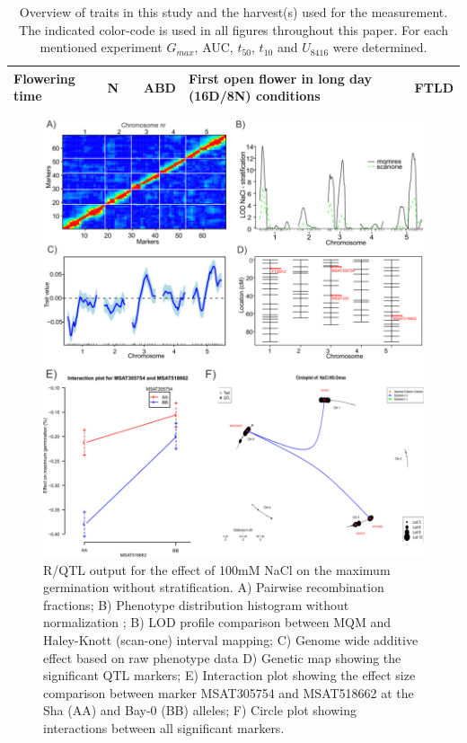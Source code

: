 \begin{table}[h]
\begin{tabular}{ | l | c | l | l | p{4cm} | l | }
    Flowering time            & N & & ABD           & First open flower in long day (16D/8N) conditions                                                                        & FTLD                      \\
    \hline
  \end{tabular}
  \caption[Trait codes]{Overview of traits in this study and the harvest(s) used for the measurement. The indicated color-code 
          is used in all figures throughout this paper. For each mentioned experiment $G_{max}$, AUC, $t_{50}$, $t_{10}$ and $U_{8416}$ were determined.}
  \label{table:codes}
\end{table}

\begin{figure}[h!]
  \centering
  \includegraphics[keepaspectratio,scale=0.30]{eps/image_3_1_2.eps}
  \caption[Generated Output.]{R/QTL output for the effect of 100mM NaCl on the maximum germination without 
          stratification. A) Pairwise recombination fractions; B) Phenotype distribution histogram without 
          normalization ; B) LOD profile comparison between MQM and Haley-Knott (scan-one) interval mapping; 
          C) Genome wide additive effect based on raw phenotype data D) Genetic map showing the significant 
          QTL markers; E) Interaction plot showing the effect size comparison between marker MSAT305754 and 
          MSAT518662 at the Sha (AA) and Bay-0 (BB) alleles; F) Circle plot showing interactions between 
          all significant markers.}
          \label{fig:generatedoutput}
\end{figure}

